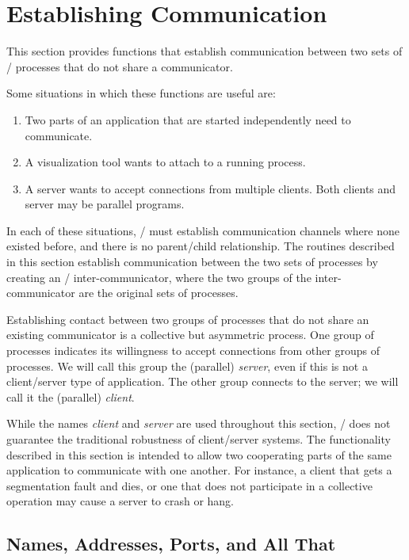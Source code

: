 \section{Establishing Communication}
\label{sec:client-server}


This section provides functions that establish communication between
two sets of \MPI/ processes that do not share a communicator.

Some situations in which these functions are useful are:
\begin{enumerate}
\item Two parts of an application that are started independently need to
communicate.
\item A visualization tool wants to attach to a running process.
\item A server wants to accept connections from multiple clients.  Both
clients and server may be parallel programs.


\end{enumerate}
In each of these situations, \MPI/ must establish communication
channels where none existed before, and there is no parent/child
relationship.
The routines described in this section establish communication
between the two sets of processes by
creating an \MPI/ inter-communicator,
where the two groups of the inter-communicator
are the original sets of processes.

Establishing contact between two groups of processes that do not share an
existing communicator is a collective but asymmetric process.  One group of
processes indicates its willingness to accept connections from other groups of
processes.  We will call this group the (parallel) \emph{server}, even if this
is not a client/server type of application.  The other group connects to the
server; we will call it the (parallel) \emph{client}.

\begin{users}
While the names \emph{client} and \emph{server} are used throughout
this section, \MPI/ does not guarantee the traditional robustness
of client/server systems. The functionality described in this
section is intended to allow two cooperating parts of the
same application to communicate with one another. For instance,
a client that gets a segmentation fault
and dies, or one that does not participate in a collective
operation may cause a server to crash or hang.
\end{users}

\subsection{Names, Addresses, Ports,  and All That}

